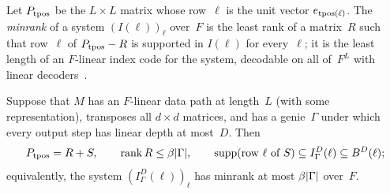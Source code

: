 Let $P_{\operatorname{tpos}}$ be the $L\times L$ matrix whose row~$\ell$ is the unit vector $e_{\operatorname{tpos}(\ell)}$. The \emph{minrank} of a
system $(I(\ell))_\ell$ over~$F$ is the least rank of a matrix~$R$ such that row~$\ell$ of $P_{\operatorname{tpos}}-R$ is supported in
$I(\ell)$ for every~$\ell$; it is the least length of an $F$-linear index code for the system, decodable on all of~$F^L$ with
linear decoders~\cite{Haemers1979,BBJK2011}.

\begin{lemma}\label{lem:rigidity}
Suppose that $M$ has an $F$-linear data path at length~$L$ (with some representation), transposes all $d\times d$ matrices,
and has a genie~$\Gamma$ under which every output step has linear depth at most~$D$. Then
\[
  P_{\operatorname{tpos}}=R+S,\qquad\operatorname{rank} R\le\beta\lvert \Gamma \rvert,\qquad\operatorname{supp}(\text{row }\ell\text{ of }S)\subseteq I^D_\Gamma(\ell)
  \subseteq B^D(\ell);
\]
equivalently, the system $(I^D_\Gamma(\ell))_\ell$ has minrank at most $\beta\lvert \Gamma \rvert$ over~$F$.
\end{lemma}

